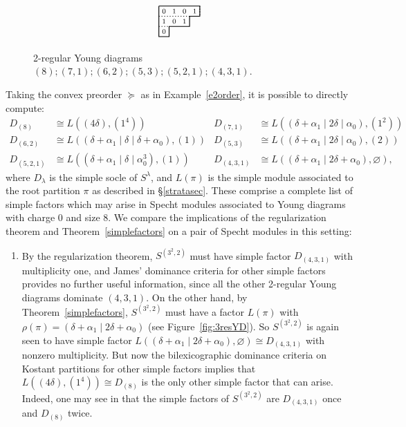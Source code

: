 \documentclass[Unicode,ALCO]{cedram}
\newcommand{\0}{{\bar 0}}
\begin{document}
\begin{exam}
\begin{figure}
\begin{align*}
{\begin{tikzpicture}[scale=0.37]
\draw[thick, dotted] (4,0)--(4,-1);
\draw[thick, dotted] (0,-1)--(3,-1);
\draw[thick, dotted] (0,-2)--(1,-2);
\node at (0.5,-0.5){$\scriptstyle0 $};
\node at (1.5,-0.5){$\scriptstyle1 $};
\node at (2.5,-0.5){$\scriptstyle0 $};
\node at (3.5,-0.5){$\scriptstyle1 $};
\node at (2.5,-1.5){$\scriptstyle1 $};
\node at (0.5,-2.5){$\scriptstyle0 $};
\node at (1.5,-1.5){$\scriptstyle0 $};
\node at (0.5,-1.5){$\scriptstyle1 $};
\draw[thick]  (0,0)--(4,0)--(4,-1)--(3,-1)--(3,-2)--(1,-2)--(1,-3)--(0,-3)--(0,0);
\end{tikzpicture}
}
\end{align*}
\caption{2-regular Young diagrams \((8); (7,1); (6,2); (5,3); (5,2,1); (4,3,1)\).}
\label{fig:2resYD}       
\end{figure}
Taking the convex preorder \(\succeq\) as in Example~\ref{e2order}, it is possible to directly compute:
\begin{align*}
D_{(8)} &\cong L((4 \delta), (1^4))
&D_{(7,1)} &\cong L((\delta + \alpha_1 \mid 2\delta \mid \alpha_0), (1^2))\\
D_{(6,2)} & \cong L((\delta + \alpha_1 \mid \delta \mid \delta + \alpha_0), (1))
&D_{(5,3)} & \cong L((\delta + \alpha_1 \mid 2\delta \mid  \alpha_0), (2))\\
D_{(5,2,1)} & \cong L((\delta + \alpha_1 \mid \delta \mid \alpha_0^3), (1))
&D_{(4,3,1)} & \cong L((\delta + \alpha_1 \mid 2 \delta + \alpha_0), \varnothing),
\end{align*}
where \(D_\lambda\) is the simple socle of \(S^\lambda\), and \(L(\pi)\) is the simple module associated to the root partition \(\pi\) as described in \S\ref{stratasec}. These comprise a complete list of simple factors which may arise in Specht modules associated to Young diagrams with charge 0 and size 8. We compare the implications of the regularization theorem and Theorem~\ref{simplefactors} on a pair of Specht modules in this setting:

\begin{enumerate}
\item[(1)] By the regularization theorem, \(S^{(3^2,2)}\) must have simple factor \(D_{(4,3,1)}\) with multiplicity one, and James' dominance criteria for other simple factors provides no further useful information, since all the other 2-regular Young diagrams dominate \((4,3,1)\). On the other hand, by Theorem~\ref{simplefactors}, \(S^{(3^2,2)}\) must have a factor \(L(\pi)\) with \(\rho(\pi) = (\delta + \alpha_1 \mid 2 \delta + \alpha_0)\)  (see Figure~\ref{fig:3resYD}). So \(S^{(3^2,2)}\) is again seen to have simple factor \(L((\delta + \alpha_1 \mid 2 \delta + \alpha_0), \varnothing) \cong D_{(4,3,1)} \) with nonzero multiplicity. But now the bilexicographic dominance criteria on Kostant partitions for other simple factors implies that \(L((4 \delta), (1^4)) \cong D_{(8)} \) is the only other simple factor that can arise. Indeed, one may see in \cite{JamesBookRepSym} that the simple factors of \(S^{(3^2,2)}\) are \(D_{(4,3,1)}\) once and \(D_{(8)}\) twice.


\end{enumerate}
\end{exam}
\end{document}
